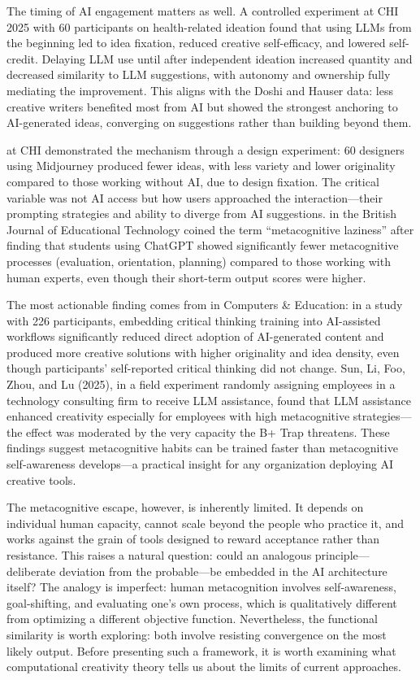 \documentclass[12pt,a4paper]{article}
\begin{document}
The timing of AI engagement matters as well. A controlled experiment at CHI 2025 with 60 participants on health-related ideation \citep{qin2025} found that using LLMs from the beginning led to idea fixation, reduced creative self-efficacy, and lowered self-credit. Delaying LLM use until after independent ideation increased quantity and decreased similarity to LLM suggestions, with autonomy and ownership fully mediating the improvement. This aligns with the Doshi and Hauser data: less creative writers benefited most from AI but showed the strongest anchoring to AI-generated ideas, converging on suggestions rather than building beyond them.

\citet{wadinambiarachchi2024} at CHI demonstrated the mechanism through a design experiment: 60 designers using Midjourney produced fewer ideas, with less variety and lower originality compared to those working without AI, due to design fixation. The critical variable was not AI access but how users approached the interaction---their prompting strategies and ability to diverge from AI suggestions. \citet{fan2024} in the British Journal of Educational Technology coined the term ``metacognitive laziness'' after finding that students using ChatGPT showed significantly fewer metacognitive processes (evaluation, orientation, planning) compared to those working with human experts, even though their short-term output scores were higher.

The most actionable finding comes from \citet{hou2026} in Computers \& Education: in a study with 226 participants, embedding critical thinking training into AI-assisted workflows significantly reduced direct adoption of AI-generated content and produced more creative solutions with higher originality and idea density, even though participants' self-reported critical thinking did not change. Sun, Li, Foo, Zhou, and Lu (2025), in a field experiment randomly assigning employees in a technology consulting firm to receive LLM assistance, found that LLM assistance enhanced creativity especially for employees with high metacognitive strategies---the effect was moderated by the very capacity the B+ Trap threatens. These findings suggest metacognitive habits can be trained faster than metacognitive self-awareness develops---a practical insight for any organization deploying AI creative tools.

The metacognitive escape, however, is inherently limited. It depends on individual human capacity, cannot scale beyond the people who practice it, and works against the grain of tools designed to reward acceptance rather than resistance. This raises a natural question: could an analogous principle---deliberate deviation from the probable---be embedded in the AI architecture itself? The analogy is imperfect: human metacognition involves self-awareness, goal-shifting, and evaluating one's own process, which is qualitatively different from optimizing a different objective function. Nevertheless, the functional similarity is worth exploring: both involve resisting convergence on the most likely output. Before presenting such a framework, it is worth examining what computational creativity theory tells us about the limits of current approaches.
\end{document}
